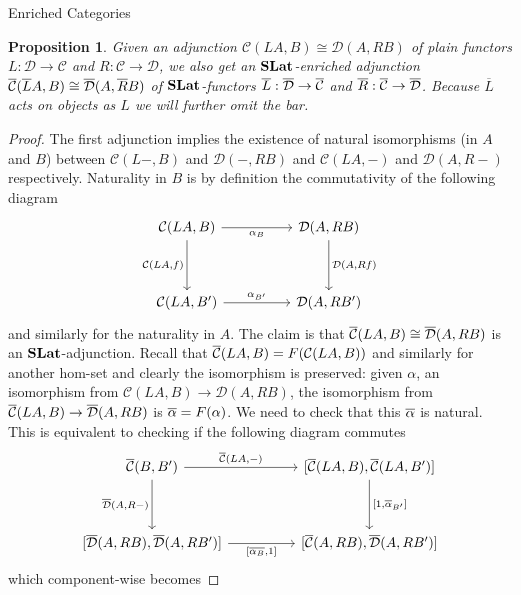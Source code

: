 \documentclass[acmsmall, screen, nonacm]{acmart}
\newtheorem{proposition}[theorem]{Proposition}
\begin{document}
\begin{section}{Enriched Categories}
\begin{proposition}
  Given an adjunction $\mathcal{C}(LA,B) \cong \mathcal{D}(A,RB)$ of plain functors $L : \mathcal{D} \to \mathcal{C}$ and $R : \mathcal{C} \to \mathcal{D}$, we also get an $\mathbf{SLat}$-enriched adjunction ${\overline{\mathcal{C}}}(\overline{L}A,B) \cong {\overline{\mathcal{D}}}(A, \overline{R}B)$ of $\mathbf{SLat}$-functors $\overline{L} : {\overline{\mathcal{D}}} \to {\overline{\mathcal{C}}}$ and $\overline{R} : {\overline{\mathcal{C}}} \to {\overline{\mathcal{D}}}$.
  Because $\overline{L}$ acts on objects as $L$ we will further omit the bar.
\end{proposition}
\begin{proof}
  The first adjunction implies the existence of natural isomorphisms (in $A$ and $B$) between $\mathcal{C}(L-,B)$ and $\mathcal{D}(-,RB)$ and $\mathcal{C}(LA,-)$ and $\mathcal{D}(A,R-)$ respectively.
  Naturality in $B$ is by definition the commutativity of the following diagram
  \begin{equation}
    \label{diag:naturality_plain}
  \begin{tikzcd}
	{\mathcal{C}(LA,B)} && {\mathcal{D}(A,RB)} \\
	\\
	{\mathcal{C}(LA,B')} && {\mathcal{D}(A,RB')}
	\arrow["{\alpha_{B}}"', from=1-1, to=1-3]
	\arrow["{\mathcal{C}(LA,f)}"', from=1-1, to=3-1]
	\arrow["{\mathcal{D}(A,Rf)}", from=1-3, to=3-3]
	\arrow["{\alpha_{B'}}", from=3-1, to=3-3]
  \end{tikzcd}
\end{equation}
  and similarly for the naturality in $A$.
  The claim is that ${\overline{\mathcal{C}}}(LA,B) \cong {\overline{\mathcal{D}}}(A,RB)$ is an $\mathbf{SLat}$-adjunction.
  Recall that ${\overline{\mathcal{C}}}(LA,B) = F(\mathcal{C}(LA,B))$ and similarly for another hom-set and clearly the isomorphism is preserved: given $\alpha$, an isomorphism from $\mathcal{C}(LA,B) \to \mathcal{D}(A,RB)$, the isomorphism from ${\overline{\mathcal{C}}}(LA,B) \to {\overline{\mathcal{D}}}(A,RB)$ is ${\overline{\mathcal{\alpha}}} = F(\alpha)$.
  We need to check that this ${\overline{\mathcal{\alpha}}}$ is natural.
  This is equivalent to checking if the following diagram commutes
  \[\begin{tikzcd}
	{\enriched{C}(B,B')} && {[\enriched{C}(LA,B),\enriched{C}(LA,B')]} \\
	\\
	{[\enriched{D}(A,RB),\enriched{D}(A,RB')]} && {[\enriched{C}(A,RB),\enriched{D}(A,RB')]}
	\arrow["{\enriched{C}(LA,-)}", from=1-1, to=1-3]
	\arrow["{\enriched{D}(A,R-)}"', from=1-1, to=3-1]
	\arrow["{[1,\overline{\alpha}_{B'}]}", from=1-3, to=3-3]
	\arrow["{[\overline{\alpha_{B}},1]}"', from=3-1, to=3-3]
\end{tikzcd}\]
which component-wise becomes


\end{proof}
\end{section}
\end{document}
